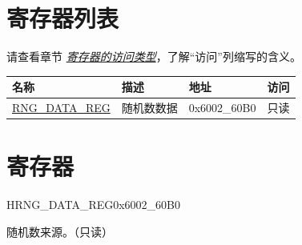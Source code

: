 \documentclass[main\_\_CN.tex]{subfiles}
\begin{document}

\hypertarget{rng-reg-summ}{}
\section{寄存器列表}

请查看章节 \hyperref[glossary-access-types]{\textit{寄存器的访问类型}}，了解“访问”列缩写的含义。

\begin{table}[H]
    \centering
    \begin{tabular}{ | L{3cm} | L{2.5cm} | C{2.5cm} | C{1cm} |  }
    \hline
    名称 & 描述 & 地址 & 访问 \\
    \hline
    \hyperref[regdesc:RNGDATAREG]{RNG\_DATA\_REG} & 随机数数据 & 0x6002\_60B0 & 只读 \\
    \hline
    \end{tabular}
\end{table}




\section{寄存器}

\begin{register}{H}{RNG\_DATA\_REG}{0x6002\_60B0}\label{regdesc:RNGDATAREG}
%
\regnewline%
\begin{regdesc}\begin{reglist}
\item [RNG\_DATA]随机数来源。（只读）
\end{reglist}\end{regdesc}
\end{register}
\end{document}
